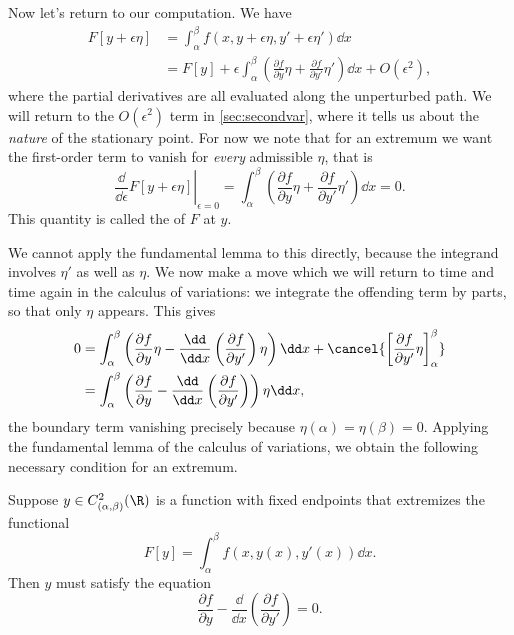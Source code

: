 Now let's return to our computation. We have
\begin{align*}
	F[y + \epsilon \eta] &= \int_{\alpha}^{\beta} f(x, y + \epsilon \eta, y' + \epsilon \eta') \dd x \\
	&= F[y] + \epsilon \int_{\alpha}^{\beta} \left(\frac{\partial f}{\partial y} \eta + \frac{\partial f}{\partial y'} \eta '\right) \dd x + O(\epsilon^2),
\end{align*}
where the partial derivatives are all evaluated along the unperturbed path.
We will return to the $O(\epsilon^2)$ term in \autoref{sec:secondvar}, where it tells us about the \emph{nature} of the stationary point. For now we note that for an extremum we want the first-order term to vanish for \emph{every} admissible $\eta$, that is
$$
\left.\frac{\dd}{\dd \epsilon}F[y + \epsilon \eta]\right|_{\epsilon = 0} = \int_{\alpha}^{\beta}\left(\frac{\partial f}{\partial y}\eta + \frac{\partial f}{\partial y'}\eta'\right)\dd x = 0.
$$
This quantity is called the  of $F$ at $y$.

We cannot apply the fundamental lemma to this directly, because the integrand involves $\eta'$ as well as $\eta$. We now make a move which we will return to time and time again in the calculus of variations: we integrate the offending term by parts, so that only $\eta$ appears. This gives
\begin{align*}
	0 &= \int_{\alpha}^{\beta} \left(\frac{\partial f}{\partial y} \eta - \frac{\dd}{\dd x} \left(\frac{\partial f}{\partial y'}\right) \eta\right) \dd x + \cancel{\left[\frac{\partial f}{\partial y'}\eta\right]_{\alpha}^{\beta}} \\
	&= \int_{\alpha}^{\beta} \left(\frac{\partial f}{\partial y} - \frac{\dd}{\dd x} \left(\frac{\partial f}{\partial y'}\right)\right) \eta \dd x,
\end{align*}
the boundary term vanishing precisely because $\eta(\alpha) = \eta(\beta) = 0$.
Applying the fundamental lemma of the calculus of variations, we obtain the following necessary condition for an extremum.

\begin{theorem}
	Suppose $y \in C^2_{(\alpha, \beta)}(\R)$ is a function with fixed endpoints that extremizes the functional
	$$
	F[y] = \int_{\alpha}^{\beta} f(x, y(x), y'(x)) \dd x.
	$$
	Then $y$ must satisfy the  equation
	\begin{equation}\label{eq:el}
		\frac{\partial f}{\partial y} - \frac{\dd}{\dd x} \left(\frac{\partial f}{\partial y'}\right) = 0. \tag{$\dagger$}
	\end{equation}
\end{theorem}

